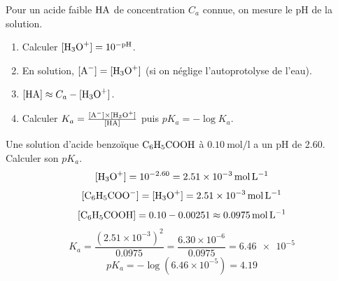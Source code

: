 Pour un acide faible $\ce{HA}$ de concentration $C_a$ connue, on mesure le pH de la solution.
\begin{enumerate}
    \item Calculer $[\ce{H3O+}] = 10^{-\text{pH}}$.
    \item En solution, $[\ce{A-}] = [\ce{H3O+}]$ (si on néglige l'autoprotolyse de l'eau).
    \item $[\ce{HA}] \approx C_a - [\ce{H3O+}]$.
    \item Calculer $K_a = \frac{[\ce{A-}] \times [\ce{H3O+}]}{[\ce{HA}]}$ puis $pK_a = -\log K_a$.
\end{enumerate}
\begin{exemple}
Une solution d'acide benzoïque $\ce{C6H5COOH}$ à $\SI{0.10}{\mol\per\litre}$ a un pH de 2.60. Calculer son $pK_a$.
\[
[\ce{H3O+}] = 10^{-2.60} = \SI{2.51e-3}{\mol\per\litre}
\]
\[
[\ce{C6H5COO-}] = [\ce{H3O+}] = \SI{2.51e-3}{\mol\per\litre}
\]
\[
[\ce{C6H5COOH}] = 0.10 - 0.00251 \approx \SI{0.0975}{\mol\per\litre}
\]
\[
K_a = \frac{(2.51 \times 10^{-3})^2}{0.0975} = \frac{6.30 \times 10^{-6}}{0.0975} = \num{6.46e-5}
\]
\[
pK_a = -\log(6.46 \times 10^{-5}) = 4.19
\]
\end{exemple}